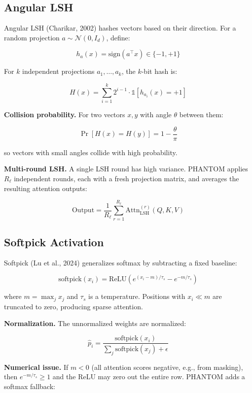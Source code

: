 \subsection{Angular LSH}

Angular LSH (Charikar, 2002) hashes vectors based on their direction. For a 
random projection $a \sim \mathcal{N}(0, I_d)$, define:

\[
h_a(x) = \text{sign}(a^\top x) \in \{-1, +1\}
\tag{3.5}
\]

For $k$ independent projections $a_1, \dots, a_k$, the $k$-bit hash is:

\[
H(x) = \sum_{i=1}^{k} 2^{i-1} \cdot \mathbb{1}[h_{a_i}(x) = +1]
\tag{3.6}
\]

\textbf{Collision probability.} For two vectors $x, y$ with angle $\theta$ between 
them:

\[
\Pr[H(x) = H(y)] = 1 - \frac{\theta}{\pi}
\tag{3.7}
\]

so vectors with small angles collide with high probability.

\textbf{Multi-round LSH.} A single LSH round has high variance. PHANTOM applies 
$R_\ell$ independent rounds, each with a fresh projection matrix, and 
averages the resulting attention outputs:

\[
\text{Output} = \frac{1}{R_\ell} \sum_{r=1}^{R_\ell} \text{Attn}_{\text{LSH}}^{(r)}(Q, K, V)
\tag{3.8}
\]

\subsection{Softpick Activation}

Softpick (Lu et al., 2024) generalizes softmax by subtracting a fixed baseline:

\[
\text{softpick}(x_i) = \text{ReLU}\!\left(e^{(x_i - m)/\tau_s} - e^{-m/\tau_s}\right)
\tag{3.9}
\]

where $m = \max_j x_j$ and $\tau_s$ is a temperature. Positions with 
$x_i \ll m$ are truncated to zero, producing sparse attention.

\textbf{Normalization.} The unnormalized weights are normalized:

\[
\hat{p}_i = \frac{\text{softpick}(x_i)}{\sum_j \text{softpick}(x_j) + \epsilon}
\tag{3.10}
\]

\textbf{Numerical issue.} If $m < 0$ (all attention scores negative, e.g., from 
masking), then $e^{-m/\tau_s} \geq 1$ and the ReLU may zero out the entire 
row. PHANTOM adds a softmax fallback:

